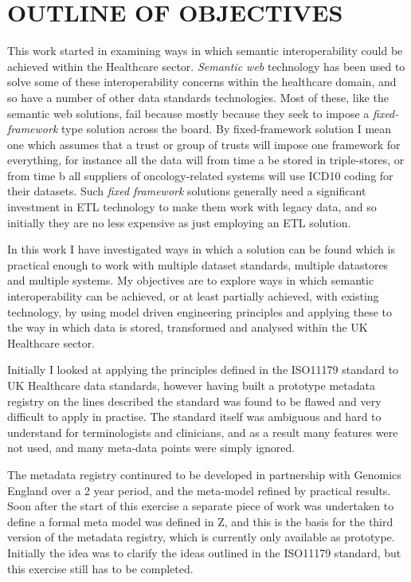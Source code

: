 \documentclass[a4paper,twoside]{article}
\begin{document}
\section{\uppercase{OUTLINE OF OBJECTIVES}}
\noindent This work started in examining ways in which semantic interoperability could be achieved within the Healthcare sector. \emph{Semantic web} technology has been used to solve some of these interoperability concerns within the healthcare domain, and so have a number of other  data standards technologies. Most of these, like the semantic web solutions, fail because mostly because they seek to impose a  \emph{fixed-framework} type solution across the board. By fixed-framework solution I mean one which assumes that a trust or group of trusts will impose one framework for everything, for instance all the data will from time a be stored in triple-stores, or from time b all suppliers of oncology-related systems will use ICD10 coding for their datasets. Such \emph{fixed framework} solutions generally need a significant investment in ETL technology to make them work with legacy data, and so initially they are no less expensive as just employing an ETL solution.

In this work I have investigated ways in which a solution can be found which is practical enough to work with multiple dataset standards, multiple datastores and multiple systems. My objectives are to explore ways in which semantic interoperability can be achieved, or at least partially achieved, with existing technology, by using model driven engineering principles and applying these to the way in which data is stored, transformed and analysed within the UK Healthcare sector.

Initially I looked at applying the principles defined in the ISO11179 \cite{ISO11179} standard to UK Healthcare data standards, however having built a prototype metadata registry on the lines described the standard was found to be flawed and very difficult to apply in practise. The standard itself was ambiguous and hard to understand for terminologists and clinicians, and as a result many features were not used, and many meta-data points were simply ignored.

The metadata registry continured to be developed in partnership with Genomics England over a 2 year period, and the meta-model refined by practical results. Soon after the start of this exercise a separate piece of work was undertaken to define a formal meta model was defined in Z, and this is the basis for the third version of the metadata registry, which is currently only available as prototype. Initially the idea was to clarify the ideas outlined in the ISO11179 standard, but this exercise still has to be completed.
\end{document}
